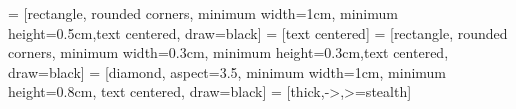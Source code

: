 \usepackage{tikz}
\usetikzlibrary{positioning}
\usetikzlibrary{calc}
\usetikzlibrary{shapes.geometric, arrows}
 = [rectangle, rounded corners, minimum width=1cm, minimum height=0.5cm,text centered, draw=black]
 = [text centered]
 = [rectangle, rounded corners, minimum width=0.3cm, minimum height=0.3cm,text centered, draw=black]
 = [diamond, aspect=3.5, minimum width=1cm, minimum height=0.8cm, text centered, draw=black]
 = [thick,->,>=stealth]